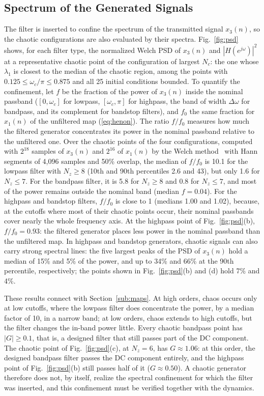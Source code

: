 \documentclass[journal]{IEEEtran}
\begin{document}
\subsection{Spectrum of the Generated Signals}
\label{sec:spectrum}
The filter is inserted to confine the spectrum of the transmitted signal
$x_3(n)$, so the chaotic configurations are also evaluated by their spectra.
Fig.~\ref{fig:psd} shows, for each filter type, the normalized Welch PSD of
$x_3(n)$ and $|H(e^{j\omega})|^2$ at a representative chaotic point of the
configuration of largest $N_c$: the one whose $\lambda_1$ is closest to the
median of the chaotic region, among the points with
$0.125\le\omega_c/\pi\le0.875$ and all 25 initial conditions bounded. To quantify the confinement, let $f$ be
the fraction of the power of $x_3(n)$ inside the nominal passband ($[0,\omega_c]$
for lowpass, $[\omega_c,\pi]$ for highpass, the band of width $\Delta\omega$ for
bandpass, and its complement for bandstop filters), and $f_0$ the same fraction
for $x_1(n)$ of the unfiltered map (\ref{eq:henon}). The ratio $f/f_0$ measures
how much the filtered generator concentrates its power in the nominal passband
relative to the unfiltered one. Over the chaotic points of the four
configurations, computed with $2^{18}$ samples of $x_3(n)$ and $2^{16}$ of
$x_1(n)$ by the Welch method~\cite[Sec.~10.5.3]{Oppenheim2009} with Hann
segments of 4,096 samples and 50\% overlap, the median of $f/f_0$ is 10.1
for the lowpass filter with $N_z\ge8$ (10th and 90th percentiles 2.6 and 43),
but only 1.6 for $N_z\le7$. For the bandpass filter, it is 5.8 for $N_z\ge8$
and 0.8 for $N_z\le7$, and most of the power remains outside the nominal band
(median $f=0.04$). For the highpass and bandstop filters, $f/f_0$
is close to 1 (medians 1.00 and 1.02), because, at the
cutoffs where most of their chaotic points occur, their nominal passbands
cover nearly the whole frequency axis. At the highpass point of
Fig.~\ref{fig:psd}(b), $f/f_0=0.93$: the filtered generator places less power
in the nominal passband than the unfiltered map. In highpass and bandstop
generators,
chaotic signals can also carry strong spectral lines: the five largest peaks
of the PSD of $x_3(n)$ hold a median of 15\% and 5\% of the power, and up to
34\% and 66\% at the 90th percentile, respectively; the points shown in
Fig.~\ref{fig:psd}(b) and (d) hold 7\% and 4\%.

These results connect with Section~\ref{sub:maps}. At high orders, chaos occurs
only at low cutoffs, where the lowpass filter does concentrate the power, by a
median factor of 10, in a narrow band; at low orders, chaos extends to high
cutoffs, but the filter changes the in-band power little. Every chaotic
bandpass point has $|G|\ge0.1$, that is, a designed filter that still passes
part of the DC component. The chaotic point of Fig.~\ref{fig:psd}(c), at
$N_z=6$, has $G\approx1.06$: at this order, the designed bandpass filter passes
the DC component entirely, and the highpass point of Fig.~\ref{fig:psd}(b)
still passes half of it ($G\approx0.50$). A chaotic generator therefore does not, by itself, realize the
spectral confinement for which the filter was inserted, and this confinement
must be verified together with the dynamics.
\end{document}
